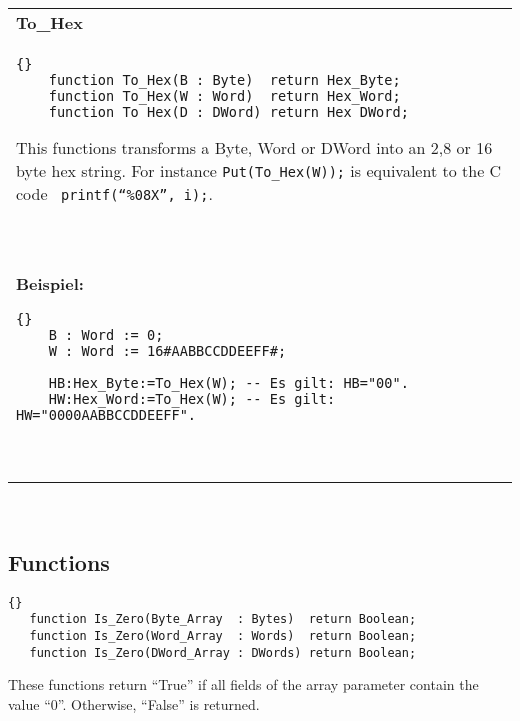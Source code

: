 
\begin{tabular}{p{\textwidth}}
  \textbf{To\_Hex}\ \\
  \begin{lstlisting}{}
    function To_Hex(B : Byte)  return Hex_Byte;
    function To_Hex(W : Word)  return Hex_Word;
    function To_Hex(D : DWord) return Hex_DWord;
  \end{lstlisting}
  This functions  transforms a Byte, Word or DWord into an 2,8 or 16 byte
  hex string.
  For instance \texttt{Put(To\_Hex(W));} is equivalent to the C code
  \texttt{ printf(``\%08X'', i);}.\\ \ \\
  \textbf{Beispiel:}
\begin{lstlisting}{}
    B : Word := 0;
    W : Word := 16#AABBCCDDEEFF#;
    
    HB:Hex_Byte:=To_Hex(W); -- Es gilt: HB="00".
    HW:Hex_Word:=To_Hex(W); -- Es gilt: HW="0000AABBCCDDEEFF".
  \end{lstlisting}\ \\
\end{tabular}\ \\




\subsection{Functions}
\begin{lstlisting}{}
   function Is_Zero(Byte_Array  : Bytes)  return Boolean;
   function Is_Zero(Word_Array  : Words)  return Boolean;
   function Is_Zero(DWord_Array : DWords) return Boolean;
\end{lstlisting}
These functions return ``True'' if all fields of the array parameter
contain the value ``0''. Otherwise, ``False'' is returned.\\ \ \\



